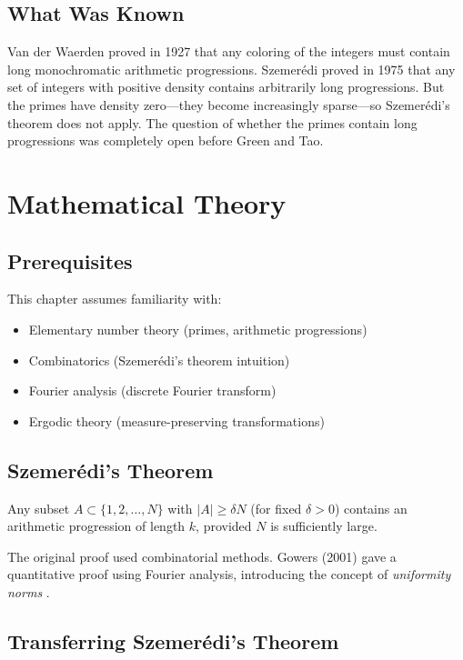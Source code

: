 \subsection{What Was Known}
Van der Waerden proved in 1927 that any coloring of the integers must contain long monochromatic arithmetic progressions. Szemer\'edi proved in 1975 that any set of integers with positive density contains arbitrarily long progressions. But the primes have density zero---they become increasingly sparse---so Szemer\'edi's theorem does not apply. The question of whether the primes contain long progressions was completely open before Green and Tao.

\section{Mathematical Theory}


\subsection{Prerequisites}
This chapter assumes familiarity with:
\begin{itemize}
\item Elementary number theory (primes, arithmetic progressions)
\item Combinatorics (Szemer\'edi's theorem intuition)
\item Fourier analysis (discrete Fourier transform)
\item Ergodic theory (measure-preserving transformations)
\end{itemize}

\subsection{Szemer\'edi's Theorem}

\begin{theorem}
Any subset $A \subset \{1, 2, \ldots, N\}$ with $|A| \geq \delta N$ (for fixed $\delta > 0$) contains an arithmetic progression of length $k$, provided $N$ is sufficiently large.
\end{theorem}

The original proof used combinatorial methods. Gowers (2001) gave a quantitative proof using Fourier analysis, introducing the concept of \emph{uniformity norms} \cite{gowers2001}.

\subsection{Transferring Szemer\'edi's Theorem}

